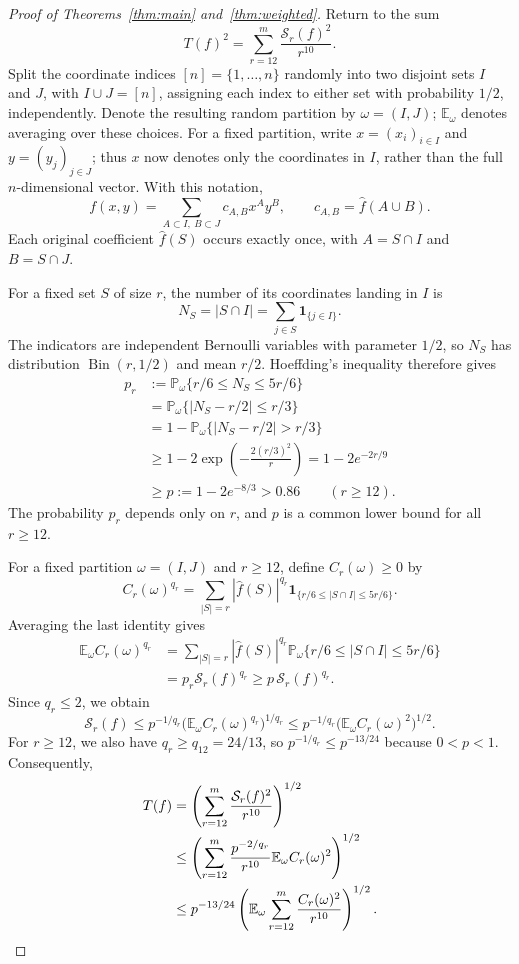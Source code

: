 \documentclass[11pt]{amsart}
\theoremstyle{remark}
\numberwithin{equation}{section}
\newcommand{\E}{\mathbb E}
\begin{document}
\begin{proof}[Proof of Theorems~\ref{thm:main} and~\ref{thm:weighted}]
Return to the sum
\[
T(f)^2=\sum_{r=12}^m\frac{\mathcal{S}_{r}(f)^2}{r^{10}}.
\]
Split the coordinate indices $[n]=\{1,\ldots,n\}$ randomly into two disjoint
sets $I$ and $J$, with $I\cup J=[n]$, assigning each index to either set
with probability $1/2$, independently. Denote the resulting random partition
by $\omega=(I,J)$; $\E_\omega$ denotes averaging over these choices.
For a fixed partition, write $x=(x_i)_{i\in I}$ and $y=(y_j)_{j\in J}$;
thus $x$ now denotes only the coordinates in $I$, rather than the full
$n$-dimensional vector. With this notation,
\[
f(x,y)=\sum_{A\subset I,\ B\subset J}c_{A,B}x^Ay^B,
\qquad c_{A,B}=\widehat f(A\cup B).
\]
Each original coefficient $\widehat f(S)$ occurs exactly once, with
$A=S\cap I$ and $B=S\cap J$.

For a fixed set $S$ of size $r$, the number of its coordinates landing in $I$ is
\[
N_S=|S\cap I|=\sum_{j\in S}\mathbf1_{\{j\in I\}}.
\]
The indicators are independent Bernoulli variables with parameter $1/2$,
so $N_S$ has distribution $\operatorname{Bin}(r,1/2)$ and mean $r/2$.
Hoeffding's inequality \cite{Hoeffding63} therefore gives
\[
\begin{aligned}
p_r&:=\mathbb P_\omega\{r/6\le N_S\le5r/6\}\\
&=\mathbb P_\omega\{|N_S-r/2|\le r/3\}\\
&=1-\mathbb P_\omega\{|N_S-r/2|>r/3\}\\
&\ge1-2\exp\!\left(-\frac{2(r/3)^2}{r}\right)
=1-2e^{-2r/9}\\
&\ge p:=1-2e^{-8/3}>0.86\qquad(r\ge12).
\end{aligned}
\]
The probability $p_r$ depends only on $r$, and $p$ is a common lower bound
for all $r\ge12$.

For a fixed partition $\omega=(I,J)$ and $r\ge12$, define
$C_r(\omega)\ge0$ by
\[
C_r(\omega)^{q_r}
=\sum_{|S|=r}|\widehat f(S)|^{q_r}
\mathbf1_{\{r/6\le|S\cap I|\le5r/6\}}.
\]
Averaging the last identity gives
\[
\begin{aligned}
\E_\omega C_r(\omega)^{q_r}
&=\sum_{|S|=r}|\widehat f(S)|^{q_r}
\mathbb P_\omega\{r/6\le|S\cap I|\le5r/6\}\\
&=p_r \mathcal{S}_{r}(f)^{q_r}\ge p\,\mathcal{S}_{r}(f)^{q_r}.
\end{aligned}
\]
Since $q_r\le2$, we obtain
\[
\mathcal{S}_{r}(f)\le p^{-1/q_r}
\bigl(\E_\omega C_r(\omega)^{q_r}\bigr)^{1/q_r}
\le p^{-1/q_r}\bigl(\E_\omega C_r(\omega)^2\bigr)^{1/2}.
\]
For $r\ge12$, we also have $q_r\ge q_{12}=24/13$, so
$p^{-1/q_r}\le p^{-13/24}$ because $0<p<1$. Consequently,
\begin{align}
T(f)&=\left(\sum_{r=12}^m\frac{\mathcal{S}_{r}(f)^2}{r^{10}}\right)^{1/2}\notag\\
&\le\left(\sum_{r=12}^m\frac{p^{-2/q_r}}{r^{10}}
\E_\omega C_r(\omega)^2\right)^{1/2}\notag\\
&\le p^{-13/24}
\left(\E_\omega\sum_{r=12}^m\frac{C_r(\omega)^2}{r^{10}}\right)^{1/2}.
\label{eq:capture}
\end{align}



\end{proof}
\end{document}
